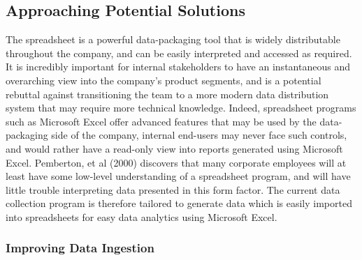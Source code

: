 \documentclass[12pt]{article}
\begin{document}
\subsection{Approaching Potential Solutions}

\indent\hspace{0.5in} The spreadsheet is a powerful data-packaging tool that is widely distributable throughout the company, and can be easily interpreted and accessed as required. It is incredibly important for internal stakeholders to have an instantaneous and overarching view into the company's product segments, and is a potential rebuttal against transitioning the team to a more modern data distribution system that may require more technical knowledge. Indeed, spreadsheet programs such as Microsoft Excel offer advanced features that may be used by the data-packaging side of the company, internal end-users may never face such controls, and would rather have a read-only view into reports generated using Microsoft Excel. Pemberton, et al (2000) discovers that many corporate employees will at least have some low-level understanding of a spreadsheet program, and will have little trouble interpreting data presented in this form factor. The current data collection program is therefore tailored to generate data which is easily imported into spreadsheets for easy data analytics using Microsoft Excel.

\subsubsection{Improving Data Ingestion}
\end{document}
